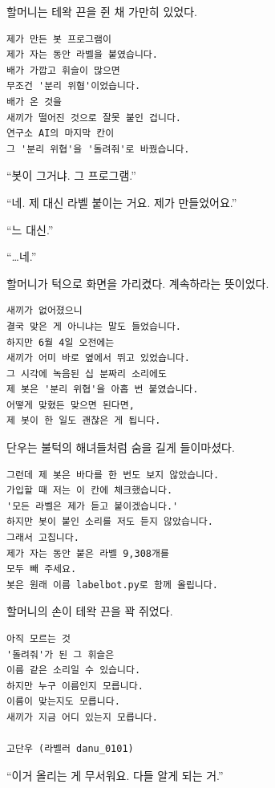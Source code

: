 \documentclass[
  korean,
  letterpaper,
  twoside,
  open=any,
  fontsize=12.5pt,
  headings=small]{scrbook}
\newcommand{\logfont}{\linespread{1}\fontsize{10.8}{15.2}\selectfont}
\begin{document}
할머니는 테왁 끈을 쥔 채
가만히 있었다.

\begin{Verbatim}[samepage=true,frame=single,framesep=2.5mm,rulecolor=\color{gray},formatcom=\logfont]
제가 만든 봇 프로그램이
제가 자는 동안 라벨을 붙였습니다.
배가 가깝고 휘슬이 많으면
무조건 '분리 위협'이었습니다.
배가 온 것을
새끼가 떨어진 것으로 잘못 붙인 겁니다.
연구소 AI의 마지막 칸이
그 '분리 위협'을 '돌려줘'로 바꿨습니다.
\end{Verbatim}

``봇이 그거냐. 그 프로그램.''

``네. 제 대신 라벨 붙이는
거요. 제가 만들었어요.''

``느 대신.''

``\ldots 네.''

할머니가 턱으로 화면을
가리켰다. 계속하라는 뜻이었다.

\begin{Verbatim}[samepage=true,frame=single,framesep=2.5mm,rulecolor=\color{gray},formatcom=\logfont]
새끼가 없어졌으니
결국 맞은 게 아니냐는 말도 들었습니다.
하지만 6월 4일 오전에는
새끼가 어미 바로 옆에서 뛰고 있었습니다.
그 시각에 녹음된 십 분짜리 소리에도
제 봇은 '분리 위협'을 아홉 번 붙였습니다.
어떻게 맞혔든 맞으면 된다면,
제 봇이 한 일도 괜찮은 게 됩니다.
\end{Verbatim}

단우는 불턱의 해녀들처럼 숨을
길게 들이마셨다.

\begin{Verbatim}[samepage=true,frame=single,framesep=2.5mm,rulecolor=\color{gray},formatcom=\logfont]
그런데 제 봇은 바다를 한 번도 보지 않았습니다.
가입할 때 저는 이 칸에 체크했습니다.
'모든 라벨은 제가 듣고 붙이겠습니다.'
하지만 봇이 붙인 소리를 저도 듣지 않았습니다.
그래서 고칩니다.
제가 자는 동안 붙은 라벨 9,308개를
모두 빼 주세요.
봇은 원래 이름 labelbot.py로 함께 올립니다.
\end{Verbatim}

할머니의 손이 테왁 끈을 꽉
쥐었다.

\begin{Verbatim}[samepage=true,frame=single,framesep=2.5mm,rulecolor=\color{gray},formatcom=\logfont]
아직 모르는 것
'돌려줘'가 된 그 휘슬은
이름 같은 소리일 수 있습니다.
하지만 누구 이름인지 모릅니다.
이름이 맞는지도 모릅니다.
새끼가 지금 어디 있는지 모릅니다.

고단우 (라벨러 danu_0101)
\end{Verbatim}

``이거 올리는 게 무서워요.
다들 알게 되는 거.''
\end{document}
